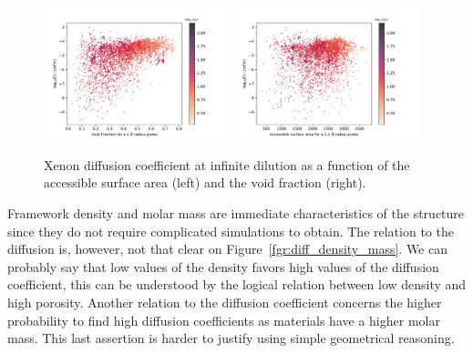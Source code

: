 \documentclass[main]{subfiles}
\begin{document}
\begin{figure}[ht]
  \centering
    \includegraphics[width=0.48\textwidth]{figures/5-diffusion/D_log-vf_2_s_+.pdf}
    \includegraphics[width=0.48\textwidth]{figures/5-diffusion/D_log-sa_12_s_+.pdf}
    \caption{Xenon diffusion coefficient at infinite dilution as a function of the accessible surface area (left) and the void fraction (right). }\label{fgr:diff_sa_vf}
\end{figure}

Framework density and molar mass are immediate characteristics of the structure since they do not require complicated simulations to obtain. The relation to the diffusion is, however, not that clear on Figure~\ref{fgr:diff_density_mass}. We can probably say that low values of the density favors high values of the diffusion coefficient, this can be understood by the logical relation between low density and high porosity. Another relation to the diffusion coefficient concerns the higher probability to find high diffusion coefficients as materials have a higher molar mass. This last assertion is harder to justify using simple geometrical reasoning. 
\end{document}

